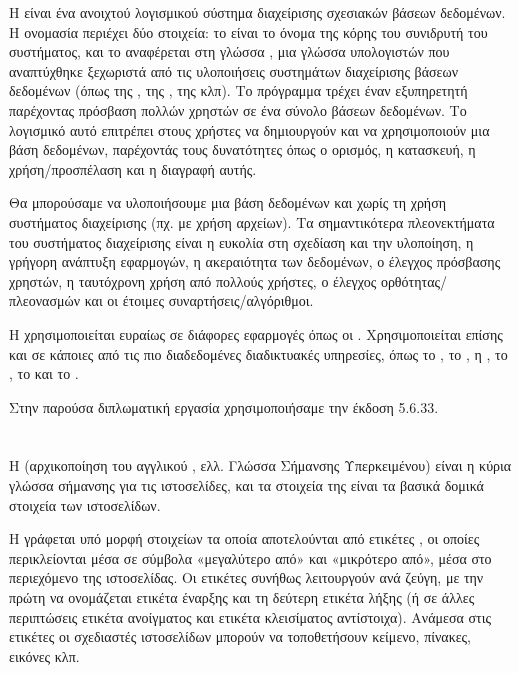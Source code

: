 Η {} \cite{sql01} είναι ένα ανοιχτού λογισμικού σύστημα διαχείρισης σχεσιακών βάσεων δεδομένων. 
Η ονομασία {} περιέχει δύο στοιχεία: το {}  είναι το όνομα της κόρης του συνιδρυτή του συστήματος, {} 
και το {} αναφέρεται στη γλώσσα {}, 
μια γλώσσα υπολογιστών που αναπτύχθηκε ξεχωριστά από τις υλοποιήσεις συστημάτων διαχείρισης βάσεων δεδομένων 
(όπως της {}, της {}, της {} κλπ).
Το πρόγραμμα τρέχει έναν εξυπηρετητή {} παρέχοντας πρόσβαση πολλών χρηστών σε ένα σύνολο βάσεων δεδομένων.
Tο λογισμικό αυτό επιτρέπει στους χρήστες να δημιουργούν και να χρησιμοποιούν μια βάση δεδομένων, παρέχοντάς τους δυνατότητες όπως
ο ορισμός, η κατασκευή, η χρήση/προσπέλαση και η διαγραφή αυτής.
\par Θα μπορούσαμε να υλοποιήσουμε μια βάση δεδομένων και χωρίς τη χρήση συστήματος διαχείρισης (πχ. με χρήση αρχείων).
Τα σημαντικότερα πλεονεκτήματα του συστήματος διαχείρισης είναι η ευκολία στη σχεδίαση και την υλοποίηση, 
η γρήγορη ανάπτυξη εφαρμογών, η ακεραιότητα των δεδομένων, ο έλεγχος πρόσβασης χρηστών, η ταυτόχρονη χρήση από πολλούς χρήστες, 
ο έλεγχος ορθότητας/πλεονασμών και οι έτοιμες συναρτήσεις/αλγόριθμοι.

\par Η {} χρησιμοποιείται ευραίως σε διάφορες εφαρμογές όπως οι {}.
Χρησιμοποιείται επίσης και σε κάποιες από τις πιο διαδεδομένες διαδικτυακές υπηρεσίες, όπως το {}, το {}, η {}, 
το {}, το {} και το {}.

\par Στην παρούσα διπλωματική εργασία χρησιμοποιήσαμε την έκδοση 5.6.33.

\section{}

Η {} (αρχικοποίηση του αγγλικού {} \cite{Ht01}, ελλ. Γλώσσα Σήμανσης Υπερκειμένου) είναι η κύρια γλώσσα σήμανσης για τις ιστοσελίδες, 
και τα στοιχεία της είναι τα βασικά δομικά στοιχεία των ιστοσελίδων.

Η {} γράφεται υπό μορφή στοιχείων {} τα οποία αποτελούνται από ετικέτες {}, 
οι οποίες περικλείονται μέσα σε σύμβολα «μεγαλύτερο από» και «μικρότερο από», μέσα στο περιεχόμενο της ιστοσελίδας. 
Οι ετικέτες {} συνήθως λειτουργούν ανά ζεύγη, 
με την πρώτη να ονομάζεται ετικέτα έναρξης και τη δεύτερη ετικέτα λήξης 
(ή σε άλλες περιπτώσεις ετικέτα ανοίγματος και ετικέτα κλεισίματος αντίστοιχα). 
Ανάμεσα στις ετικέτες οι σχεδιαστές ιστοσελίδων μπορούν να τοποθετήσουν κείμενο, πίνακες, εικόνες κλπ.

